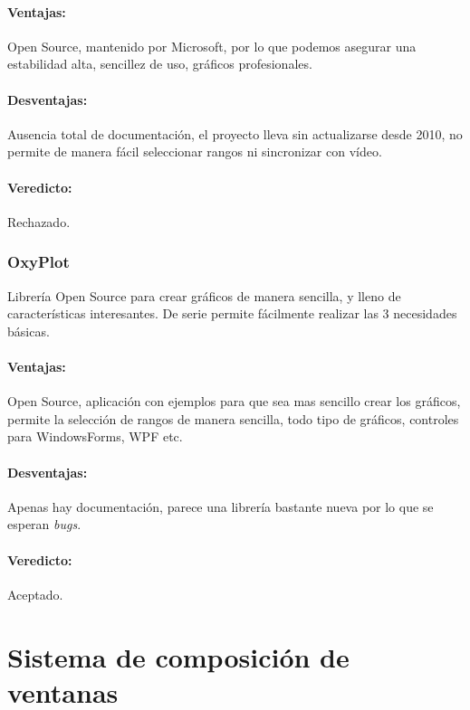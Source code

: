 \paragraph{Ventajas:} Open Source, mantenido por Microsoft, por lo que podemos asegurar una estabilidad alta, sencillez de uso, gr\'{a}ficos profesionales.
\paragraph{Desventajas:} Ausencia total de documentaci\'{o}n, el proyecto lleva sin actualizarse desde 2010, no permite de manera f\'{a}cil seleccionar 
rangos ni sincronizar con v\'{i}deo.
\paragraph{Veredicto:} Rechazado.

\subsubsection{OxyPlot}
Librer\'{i}a Open Source para crear gr\'{a}ficos de manera sencilla, y lleno de caracter\'{i}sticas interesantes. De serie permite f\'{a}cilmente
realizar las 3 necesidades b\'{a}sicas.

\paragraph{Ventajas:} Open Source, aplicaci\'{o}n con ejemplos para que sea mas sencillo crear los gr\'{a}ficos, permite la selecci\'{o}n de rangos
de manera sencilla, todo tipo de gr\'{a}ficos, controles para WindowsForms, WPF etc.
\paragraph{Desventajas:} Apenas hay documentaci\'{o}n, parece una librer\'{i}a bastante nueva por lo que se esperan \emph{bugs}. 
\paragraph{Veredicto:} Aceptado.

\section{Sistema de composici\'{o}n de ventanas}
